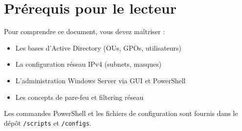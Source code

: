 \section{Prérequis pour le lecteur}

Pour comprendre ce document, vous devez maîtriser :

\begin{itemize}
    \item Les bases d'Active Directory (OUs, GPOs, utilisateurs)
    \item La configuration réseau IPv4 (subnets, masques)
    \item L'administration Windows Server via GUI et PowerShell
    \item Les concepts de pare-feu et filtering réseau
\end{itemize}

Les commandes PowerShell et les fichiers de configuration sont fournis dans le dépôt \texttt{/scripts} et \texttt{/configs}.
